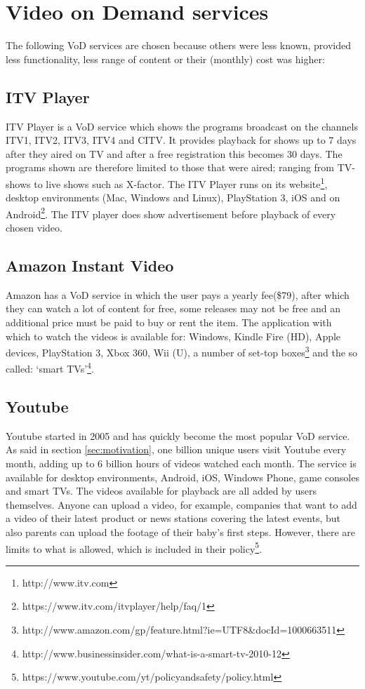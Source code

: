 \section{Video on Demand services}
\label{sec:vodserv}
The following VoD services are chosen because others were less known, provided less functionality, less range of content or their (monthly) cost was higher:

\subsection{ITV Player}
ITV Player is a VoD service which shows the programs broadcast on the channels ITV1, ITV2, ITV3, ITV4 and CITV. It provides playback for shows up to 7 days after they aired on TV and after a free registration this becomes 30 days. The programs shown are therefore limited to those that were aired; ranging from TV-shows to live shows such as X-factor. The ITV Player runs on its website\footnote{http://www.itv.com}, desktop environments (Mac, Windows and Linux), PlayStation 3, iOS and on Android\footnote{https://www.itv.com/itvplayer/help/faq/1}. The ITV player does show advertisement before playback of every chosen video.

\subsection{Amazon Instant Video}
Amazon has a VoD service in which the user pays a yearly fee(\$79), after which they can watch a lot of content for free, some releases may not be free and an additional price must be paid to buy or rent the item. The application with which to watch the videos is available for: Windows, Kindle Fire (HD), Apple devices, PlayStation 3, Xbox 360, Wii (U), a number of set-top boxes\footnote{http://www.amazon.com/gp/feature.html?ie=UTF8\&docId=1000663511} and the so called: `smart TVs'\footnote{http://www.businessinsider.com/what-is-a-smart-tv-2010-12}.

\subsection{Youtube}
Youtube started in 2005 and has quickly become the most popular VoD service. As said in section \ref{sec:motivation}, one billion unique users visit Youtube every month, adding up to 6 billion hours of videos watched each month. The service is available for desktop environments, Android, iOS, Windows Phone, game consoles and smart TVs. The videos available for playback are all added by users themselves. Anyone can upload a video, for example, companies that want to add a video of their latest product or news stations covering the latest events, but also parents can upload the footage of their baby's first steps. However, there are limits to what is allowed, which is included in their policy\footnote{https://www.youtube.com/yt/policyandsafety/policy.html}.

